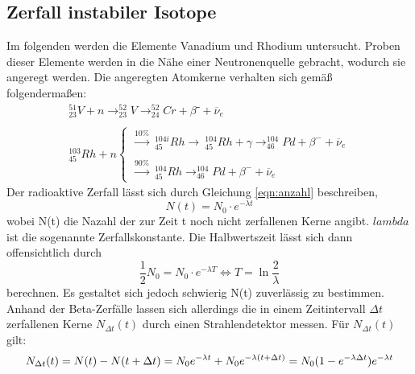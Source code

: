 \subsection{Zerfall instabiler Isotope}
    Im folgenden werden die Elemente Vanadium und Rhodium untersucht. Proben dieser 
    Elemente werden in die Nähe einer Neutronenquelle gebracht, wodurch sie angeregt werden.
    Die angeregten Atomkerne verhalten sich gemäß folgendermaßen:
    \begin{align}
        ^{51}_{23}V + n \longrightarrow ^{52}_{23}V \longrightarrow ^{52}_{24}Cr + \beta⁻ + 
        \overline{\nu}_e\\ \\
        ^{103}_{45}Rh + n 
        \begin{cases}
            \xrightarrow{10 \% }\ ^{104i}_{45}Rh \longrightarrow\ ^{104}_{45}Rh + \gamma 
            \longrightarrow ^{104}_{46}Pd + \beta^- + \overline{\nu}_e \\ \\
            \xrightarrow{90 \% }\ ^{104}_{45}Rh \longrightarrow ^{104}_{46}Pd + \beta^- + \overline{\nu}_e 
            \label{eqn:rhodium}
        \end{cases}
    \end{align}
    Der radioaktive Zerfall lässt sich durch Gleichung \ref{eqn:anzahl} beschreiben,
    \begin{equation*}
        N(t) = N_0 \cdot e^{-\lambda t}
    \end{equation*}
    wobei N(t) die Nazahl der zur Zeit t noch nicht zerfallenen Kerne angibt. $lambda$ ist die 
    sogenannte Zerfallskonstante. Die Halbwertszeit lässt sich dann offensichtlich durch
    \begin{equation}
        \dfrac{1}{2} N_0 = N_0 \cdot e^{-\lambda T}
         \Leftrightarrow T = \ln{\dfrac{2}{\lambda}}
    \end{equation}
    berechnen. Es gestaltet sich jedoch schwierig N(t) zuverlässig zu bestimmen. 
    Anhand der Beta-Zerfälle lassen sich allerdings die in einem Zeitintervall $\Delta t$ 
    zerfallenen Kerne $N_{\Delta t}(t)$ durch einen Strahlendetektor messen. Für $N_{\Delta t}(t)$
    gilt:
    \begin{equation}
        N_{\Delta t}(t) = N(t) - N(t+\Delta t) = N_0 e^{-\lambda t}+N_0 e^{-\lambda (t+\Delta t)}
        = N_0 (1-e^{-\lambda \Delta t})e^{-\lambda t}\\
    \end{equation}
